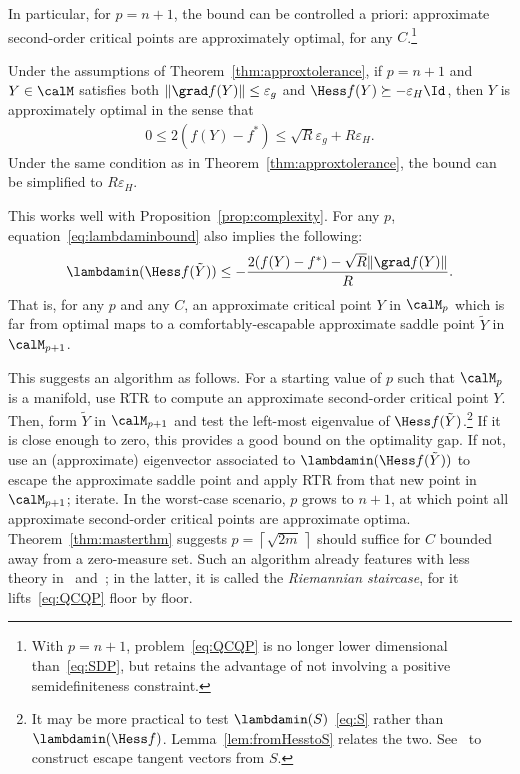 \documentclass{article}
\newcommand{\1}{\mathbf{1}}
\begin{document}
In particular, for $p=n+1$, the bound can be controlled a priori: approximate second-order critical points are approximately optimal, for any $C$.\footnote{With $p=n+1$, problem~\eqref{eq:QCQP} is no longer lower dimensional than~\eqref{eq:SDP}, but retains the advantage of not involving a positive semidefiniteness constraint.}
\begin{corollary}
	Under the assumptions of Theorem~\ref{thm:approxtolerance}, if $p=n+1$ and $Y\in\calM$ satisfies both $\|\grad f(Y)\| \leq \varepsilon_g$ and $\Hess f(Y) \succeq -\varepsilon_H \Id$, then $Y$ is approximately optimal in the sense that
	\begin{align*}
	0 \leq 2(f(Y)-f^*) \leq \sqrt{R} \varepsilon_g + R \varepsilon_H.
	\end{align*}
	Under the same condition as in Theorem~\ref{thm:approxtolerance}, the bound can be simplified to $R \varepsilon_H$.
\end{corollary}
This works well with Proposition~\ref{prop:complexity}. For any $p$, equation~\eqref{eq:lambdaminbound} also implies the following:
\begin{align*}
	\lambdamin(\Hess f(\tilde Y)) \leq - \frac{2(f(Y)-f^*) - \sqrt{R}\|\grad f(Y)\|}{R}.
\end{align*}
That is,
for any $p$ and any $C$, an approximate critical point $Y$ in $\calM_p$ which is far from optimal maps to a comfortably-escapable approximate saddle point $\tilde Y$ in $\calM_{p+1}$.

This suggests an algorithm as follows. For a starting value of $p$ such that $\calM_p$ is a manifold, use RTR to compute an approximate second-order critical point $Y$. Then, form $\tilde Y$ in $\calM_{p+1}$ and test the left-most eigenvalue of $\Hess f(\tilde Y)$.\footnote{It may be more practical to test $\lambdamin(S)$~\eqref{eq:S} rather than $\lambdamin(\Hess f)$. Lemma~\ref{lem:fromHesstoS} relates the two. See~\citep[\S3.3]{journee2010low} to construct escape tangent vectors from $S$.} If it is close enough to zero, this provides a good bound on the optimality gap. If not, use an (approximate) eigenvector associated to $\lambdamin(\Hess f(\tilde Y))$ to escape the approximate saddle point and apply RTR from that new point in $\calM_{p+1}$; iterate. In the worst-case scenario, $p$ grows to $n+1$, at which point all approximate second-order critical points are approximate optima. Theorem~\ref{thm:masterthm} suggests $p = \left\lceil \sqrt{2m} \, \right\rceil$ should suffice for $C$ bounded away from a zero-measure set. Such an algorithm already features with less theory in~\citep{journee2010low} and~\citep{boumal2015staircase}; in the latter, it is called the \emph{Riemannian staircase}, for it lifts~\eqref{eq:QCQP} floor by floor.
\end{document}
